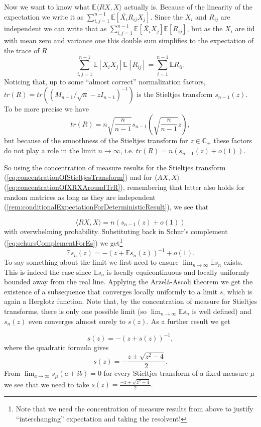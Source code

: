 Now we want to know what $\mathbb E\langle RX,X\rangle$ actually is. Because of the linearity of the expectation we write it as $\sum_{i,j=1}^{n-1}\mathbb E[\overline{X_i}R_{ij}X_j]$. Since the $X_i$ and $R_{ij}$ are independent we can write that as $\sum_{i,j=1}^{n-1}\mathbb E[\overline{X_i}X_j]\mathbb E[R_{ij}]$, but as the $X_i$ are iid with mean zero and variance one this double sum simplifies to the expectation of the trace of $R$ $$\sum_{i,j=1}^{n-1}\mathbb E[\overline{X_i}X_j]\mathbb E[R_{ij}] = \sum_{i=1}^{n-1}\mathbb ER_{ii}.$$
Noticing that, up to some ``almost correct'' normalization factors, $tr(R)=tr\left((M_{n-1}/\sqrt n-zI_{n-1})^{-1}\right)$ is the Stieltjes transform $s_{n-1}(z)$. To be more precise we have $$tr(R)=n\sqrt{\frac{n}{n-1}}s_{n-1}\left(\sqrt{\frac{n}{n-1}}z\right),$$
but because of the smoothness of the Stieltjes transform for $z\in\mathbb C_+$ these factors do not play a role in the limit $n\rightarrow\infty$, i.e. $tr(R)=n(s_{n-1}(z)+o(1))$.

So using the concentration of measure results for the Stieltjes transform (\eqref{eq:concentrationOfStieltjesTransform}) and for $\langle AX,X\rangle$(\eqref{eq:concentrationOfXRXAroundTrR}), remembering that latter also holds for random matrices as long as they are independent (\ref{rem:conditionalExpectationForDeterministicResult}), we see that

$$\langle RX,X\rangle=n(s_{n-1}(z)+o(1))$$
with overwhelming probability. Substituting back in Schur's complement (\eqref{eq:schursComplementForEs}) we get\footnote{Note that we need the concentration of measure results from above to justify ``interchanging'' expectation and taking the resolvent!} $$\mathbb Es_n(z)=-(z+\mathbb Es_n(z))^{-1}+o(1).$$
To say something about the limit we first need to ensure $\lim_{n\rightarrow\infty}\mathbb Es_n$ exists. This is indeed the case since $\mathbb Es_n$ is locally equicontinuous and locally uniformly bounded away from the real line. Applying the Arzel\'{a}-Ascoli theorem we get the existence of a subsequence that converges locally uniformly to a limit $s$, which is again a Herglotz function. Note that, by the concentration of measure for Stieltjes transforms, there is only one possible limit (so $\lim_{n\rightarrow\infty}\mathbb Es_n$ is well defined) and $s_n(z)$ even converges almost surely to $s(z)$. As a further result we get

$$s(z)=-(z+s(z))^{-1},$$
where the quadratic formula gives $$s(z)=-\frac{z\pm\sqrt{z^2-4}}{2}.$$
From $\lim_{a\rightarrow\infty}s_\mu(a+ib)=0$ for every Stieltjes transform of a fixed measure $\mu$ we see that we need to take $s(z)=\frac{-z+\sqrt{z^2-4}}{2}$.


